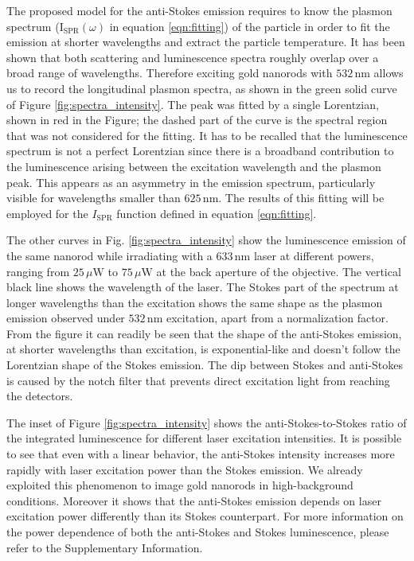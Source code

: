 \documentclass[journal=nalefd,manuscript=letter]{achemso}
\newcommand{\nm}{\ensuremath{\,\textrm{nm}}}
\newcommand{\uW}{\ensuremath{\,\mu\textrm{W}}}
\begin{document}
The proposed model for the anti-Stokes emission requires to know the plasmon
spectrum ($\textrm{I}_{\textrm{SPR}}(\omega)$ in equation \ref{eqn:fitting}) of
the particle in order to fit the emission at shorter wavelengths and extract the
particle temperature. It has been shown that both scattering and luminescence
spectra roughly overlap over a broad range of wavelengths\cite{Yorulmaz2012}. Therefore
exciting gold nanorods with $532\nm$ allows us to record the longitudinal
plasmon spectra, as shown in the green solid curve of Figure \ref{fig:spectra_intensity}. The
peak was fitted by a single Lorentzian, shown in red in the Figure; the dashed
part of the curve is the spectral region that was not considered for the
fitting. It has to be recalled that the luminescence spectrum is not a perfect
Lorentzian since there is a broadband contribution to the luminescence arising
between the excitation wavelength and the plasmon peak\cite{Boyd1986}. This
appears as an asymmetry in the emission spectrum, particularly visible for
wavelengths smaller than $625\nm$. The results of this fitting will be employed
for the $I_\textrm{SPR}$ function defined in equation \ref{eqn:fitting}. 

The other curves in Fig. \ref{fig:spectra_intensity} show the luminescence emission of
the same nanorod while irradiating with a $633\nm$ laser at different powers,
ranging from $25\uW$ to $75\uW$ at the back aperture of the objective.  
The vertical black line shows the wavelength of the laser. The Stokes part of the
spectrum at longer wavelengths than the excitation shows the same shape as the
plasmon emission observed under $532\nm$ excitation, apart from a normalization
factor. From the figure it can readily be seen that the shape of the anti-Stokes
emission, at shorter wavelengths than excitation, is exponential-like and
doesn't follow the Lorentzian shape of the Stokes emission. The dip between
Stokes and anti-Stokes is caused by the notch filter that prevents direct
excitation light from reaching the detectors. 

The inset of Figure \ref{fig:spectra_intensity} shows the anti-Stokes-to-Stokes ratio of
the integrated luminescence for different laser excitation intensities. It is
possible to see that even with a linear behavior, the anti-Stokes intensity
increases more rapidly with laser excitation power than the Stokes emission.
We already exploited this phenomenon to image gold nanorods in high-background
conditions\cite{Carattino2016a}. Moreover it shows that the anti-Stokes emission
depends on laser excitation power differently than its Stokes counterpart. For more 
information on the power dependence of both the anti-Stokes and Stokes luminescence, 
please refer to the Supplementary Information. 
\end{document}
